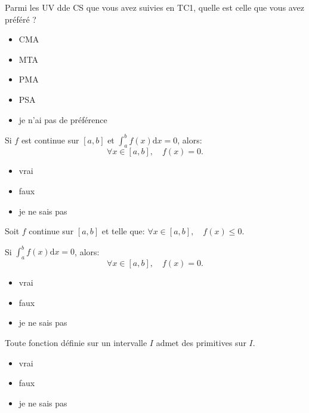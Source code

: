 \begin{clickers}\label{QEL:questionTest}
 Parmi les UV dde CS que vous avez suivies en TC1, quelle est celle que vous avez préféré ? 
 \begin{itemize}
  \item CMA
  \item MTA
  \item PMA
  \item PSA
  \item je n'ai pas de préférence
 \end{itemize}
\end{clickers}



\begin{clickers}\label{QEL:positivite_stricte_1}
  Si \(f\) est continue sur \([a,b]\) et \(\displaystyle\int_a^b f(x)\mathrm{d}x=0\), alors:
  \[\forall x \in [a,b], \quad f(x)=0.\]
 \begin{itemize}
  \item vrai
  \item faux
  \item je ne sais pas
 \end{itemize}
\end{clickers}

\begin{clickers}\label{QEL:positivite_stricte_2}
  Soit \(f\) continue sur \([a,b]\) et  telle que: \(\forall x \in [a,b], \quad f(x)\leq 0\).
  
  Si \(\displaystyle\int_a^b f(x)\mathrm{d}x=0\), alors:
  \[\forall x \in [a,b], \quad f(x)=0.\]
 \begin{itemize}
  \item vrai
  \item faux
  \item je ne sais pas
 \end{itemize}
\end{clickers}

\begin{clickers}\label{QEL:existence_primitives}
  Toute fonction définie sur un intervalle \(I\) admet des primitives sur \(I\).
 \begin{itemize}
  \item vrai
  \item faux
  \item je ne sais pas
 \end{itemize}
\end{clickers}

